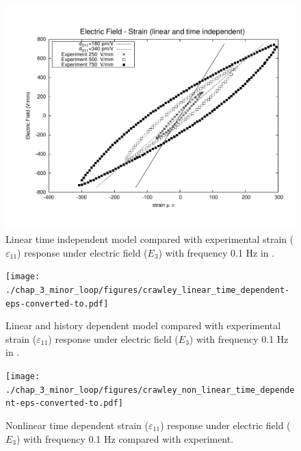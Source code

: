 \begin{figure} 
\centering 
\includegraphics[width=5.0in]{./chap_3_minor_loop/figures/crawley_linear_time_independent.pdf}
\caption{Linear time independent model compared with experimental strain ($\varepsilon_{11}$) response under electric field ($E_3$) with frequency 0.1 Hz in \cite{Crawley1990}.}
\label{fig:Crawley_xp_TimeinDepenLin}
\end{figure}
 
\begin{figure} 
\centering
\texttt{[image: ./chap\_3\_minor\_loop/figures/crawley\_linear\_time\_dependent-eps-converted-to.pdf]}
\caption{Linear and history dependent model compared with experimental strain ($\varepsilon_{11}$) response under electric field ($E_3$) with frequency 0.1 Hz in \cite{Crawley1990}.}
\label{fig:Crawley_xp_His_dependent_Lin}
\end{figure}
  
\begin{figure}
\centering
\texttt{[image: ./chap\_3\_minor\_loop/figures/crawley\_non\_linear\_time\_dependent-eps-converted-to.pdf]}
\caption{Nonlinear time dependent strain ($\varepsilon_{11}$) response under electric field ($E_3$) with frequency 0.1 Hz compared with experiment\cite{Crawley1990}.}
\label{fig:TimeDepenNonLinCrawley}
\end{figure}

